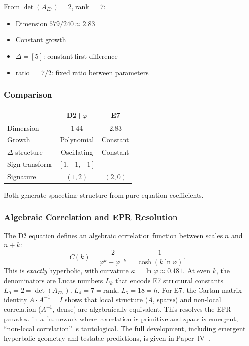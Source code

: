 \documentclass[11pt,a4paper]{article}
\begin{document}
From $\det(A_{E7}) = 2$, rank $= 7$:
\begin{itemize}
\item Dimension $679/240 \approx 2.83$
\item Constant growth
\item $\Delta = [5]$: constant first difference
\item ratio $= 7/2$: fixed ratio between parameters
\end{itemize}

\subsubsection{Comparison}

\begin{center}
\begin{tabular}{|l|c|c|}
\hline
& \textbf{D2+$\varphi$} & \textbf{E7} \\
\hline
Dimension & $1.44$ & $2.83$ \\
Growth & Polynomial & Constant \\
$\Delta$ structure & Oscillating & Constant \\
Sign transform & $[1, -1, -1]$ & -- \\
Signature & $(1, 2)$ & $(2, 0)$ \\
\hline
\end{tabular}
\end{center}

Both generate spacetime structure from pure equation coefficients.

\subsubsection{Algebraic Correlation and EPR Resolution}

The D2 equation defines an algebraic correlation function between scales $n$ and $n+k$:
\begin{equation}
C(k) = \frac{2}{\varphi^k + \varphi^{-k}} = \frac{1}{\cosh(k\ln\varphi)}.
\end{equation}
This is \emph{exactly} hyperbolic, with curvature $\kappa = \ln\varphi \approx 0.481$. At even $k$, the denominators are Lucas numbers $L_k$ that encode E7 structural constants: $L_0 = 2 = \det(A_{E7})$, $L_4 = 7 = \mathrm{rank}$, $L_6 = 18 = h$. For E7, the Cartan matrix identity $A \cdot A^{-1} = I$ shows that local structure ($A$, sparse) and non-local correlation ($A^{-1}$, dense) are algebraically equivalent. This resolves the EPR paradox: in a framework where correlation is primitive and space is emergent, ``non-local correlation'' is tautological. The full development, including emergent hyperbolic geometry and testable predictions, is given in Paper~IV~\cite{PaperIV}.
\end{document}
